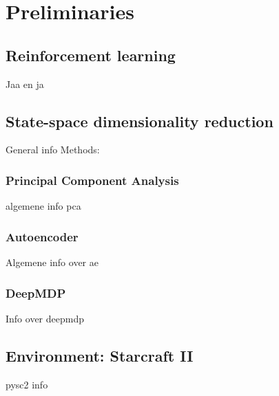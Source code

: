 \chapter{Preliminaries}\label{preliminaries}

\section{Reinforcement learning}\label{pl-rl}
Jaa en ja

\section{State-space dimensionality reduction}\label{pl-dimensionality}
General info
Methods:
\subsection{Principal Component Analysis}\label{pl-pca}
algemene info pca
\subsection{Autoencoder}\label{pl-ae}
Algemene info over ae
\subsection{DeepMDP}\label{pl-deepmdp}
Info over deepmdp

\section{Environment: Starcraft II}\label{pl-env}
pysc2 info
